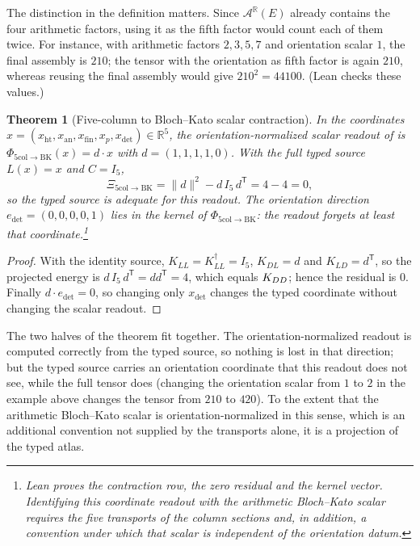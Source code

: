 \documentclass[11pt]{article}
\newtheorem{theorem}{Theorem}[section]
\theoremstyle{definition}
\newcommand{\R}{\mathbb{R}}
\newcommand{\KDL}{K_{DL}}
\newcommand{\KLL}{K_{LL}}
\newcommand{\Kdagger}{K_{LL}^{\dagger}}  \newcommand{\vsrc}{\mathrm{vsrc}}        \newcommand{\Jone}{J_1}
\begin{document}
The distinction in the definition matters.  Since $\mathcal A^{\R}(E)$
already contains the four arithmetic factors, using it as the fifth factor
would count each of them twice.  For instance, with arithmetic factors
$2,3,5,7$ and orientation scalar $1$, the final assembly is $210$; the
tensor with the orientation as fifth factor is again $210$, whereas
reusing the final assembly would give $210^2=44100$.  (Lean checks these
values.)

\begin{theorem}[Five-column to Bloch--Kato scalar contraction]\label{thm:apparatus:five-col-bk-comparison}
In the coordinates
$x=(x_{\mathrm{ht}},x_{\mathrm{an}},x_{\mathrm{fin}},x_p,x_{\det})\in\R^5$,
the orientation-normalized scalar readout of
 is
$\Phi_{\mathrm{5col}\to\mathrm{BK}}(x)=d\cdot x$ with $d=(1,1,1,1,0)$.
With the full typed source $L(x)=x$ and $C=I_5$,
\[
  \Xi_{\mathrm{5col}\to\mathrm{BK}}
  =
  \|d\|^2-d\,I_5\,d^{\mathsf T}
  =
  4-4=0,
\]
so the typed source is adequate for this readout.  The orientation
direction $e_{\det}=(0,0,0,0,1)$ lies in the kernel of
$\Phi_{\mathrm{5col}\to\mathrm{BK}}$: the readout forgets at least that
coordinate.\footnote{Lean proves the contraction row, the zero residual and the
kernel vector.  Identifying this coordinate readout with the arithmetic
Bloch--Kato scalar requires the five transports of the column sections
and, in addition, a convention under which that scalar is independent of
the orientation datum.}
\end{theorem}

\begin{proof}
With the identity source, $\KLL=\Kdagger=I_5$, $\KDL=d$ and
$K_{LD}=d^{\mathsf T}$, so the projected energy is
$d\,I_5\,d^{\mathsf T}=dd^{\mathsf T}=4$, which equals $K_{DD}$; hence the
residual is $0$.  Finally $d\cdot e_{\det}=0$, so changing only
$x_{\det}$ changes the typed coordinate without changing the scalar
readout.
\end{proof}

The two halves of the theorem fit together.  The orientation-normalized
readout is computed correctly from the typed source, so nothing is lost
in that direction; but the typed source carries an orientation coordinate
that this readout does not see, while the full tensor does (changing the
orientation scalar from $1$ to $2$ in the example above changes the
tensor from $210$ to $420$).  To the extent that the arithmetic
Bloch--Kato scalar is orientation-normalized in this sense, which is an
additional convention not supplied by the transports alone, it is a
projection of the typed atlas.
\end{document}
